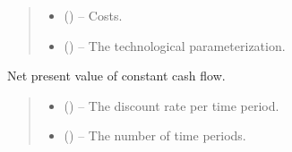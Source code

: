 \documentclass[letterpaper,10pt,english]{sphinxmanual}
\begin{document}
\begin{fulllineitems}
\begin{quote}
\begin{description}
\begin{itemize}
\item {} 
\sphinxAtStartPar
{} () – Costs.

\item {} 
\sphinxAtStartPar
{} () – The technological parameterization.

\end{itemize}

\end{description}\end{quote}

\end{fulllineitems}


\begin{fulllineitems}
\label{\detokenize{technology:technology.pv_residential_simple.npv}}
\pysigstartsignatures
{}
\pysigstopsignatures
\sphinxAtStartPar
Net present value of constant cash flow.
\begin{quote}\begin{description}
\begin{itemize}
\item {} 
\sphinxAtStartPar
{} () – The discount rate per time period.

\item {} 
\sphinxAtStartPar
{} () – The number of time periods.

\end{itemize}

\end{description}\end{quote}

\end{fulllineitems}

\end{document}
